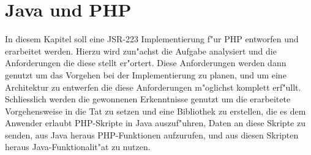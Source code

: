 \chapter{Java und PHP}
\label{sec:chap1}

In diesem Kapitel soll eine JSR-223 Implementierung f"ur PHP entworfen und erarbeitet werden. Hierzu wird zun"achst
die Aufgabe analysiert und die Anforderungen die diese stellt er"ortert. Diese Anforderungen werden dann genutzt
um das Vorgehen bei der Implementierung zu planen, und um eine Architektur zu entwerfen die diese Anforderungen 
m"oglichst komplett erf"ullt. Schliesslich werden die gewonnenen Erkenntnisse genutzt um die erarbeitete Vorgehensweise
in die Tat zu setzen und eine Bibliothek zu erstellen, die es dem Anwender erlaubt PHP-Skripte in Java auszuf"uhren,
Daten an diese Skripte zu senden, aus Java heraus PHP-Funktionen aufzurufen, und aus diesen Skripten heraus 
Java-Funktionalit"at zu nutzen.


\clearpage

\clearpage

\clearpage




